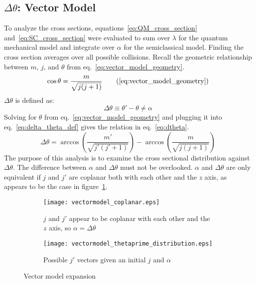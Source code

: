 \documentclass[letterpaper,titlepage,12pt]{article}
\begin{document}
\subsection{$\Delta \theta$: Vector Model}
To analyze the cross sections, equations~\ref{eq:QM_cross_section}
and~\ref{eq:SC_cross_section} were evaluated to sum over $\lambda$ for the quantum
mechanical model and integrate over $\alpha$ for the semiclassical model.
Finding the cross section averages over all possible collisions.  Recall the
geometric relationship between $m$, $j$, and $\theta$ from
eq.~\ref{eq:vector_model_geometry}.
\begin{equation*}
    \cos\theta=\frac{m}{\sqrt{j(j+1)}}
    \tag{\ref{eq:vector_model_geometry}}
\end{equation*}
$\Delta \theta$ is defined as:
\begin{equation}
    \Delta\theta\equiv\theta'-\theta\neq\alpha
    \label{eq:delta_theta_def}
\end{equation}
Solving for $\theta$ from eq.~\ref{eq:vector_model_geometry} and plugging it
into eq.~\ref{eq:delta_theta_def} gives the relation in eq.~\ref{eq:dtheta}.
\begin{equation}
    \Delta\theta = \arccos\left(\frac{m'}{\sqrt{j'(j'+1)}}\right)-\arccos\left(\frac{m}{\sqrt{j(j+1)}}\right)
    \label{eq:dtheta}
\end{equation}
The purpose of this analysis is to examine the cross sectional distribution
against $\Delta\theta$.  The difference between $\alpha$ and $\Delta\theta$
must not be overlooked.  $\alpha$ and $\Delta \theta$ are only equivalent if
$j$ and $j'$ are coplanar both with each other and the $z$ axis, as appears to
be the case in figure~\ref{fig:vectormodel_coplanar}.
\begin{figure}[ht]
    \centering
    \begin{subfigure}{0.49\textwidth}
        \texttt{[image: vectormodel\_coplanar.eps]}
        \caption{$j$ and $j'$ appear to be coplanar with each other and the $z$ axis, so $\alpha=\Delta\theta$}
\label{fig:vectormodel_coplanar}
    \end{subfigure}
    \hspace*{\fill}
    \begin{subfigure}{0.49\textwidth}
        \texttt{[image: vectormodel\_thetaprime\_distribution.eps]}
        \caption{Possible $j'$ vectors given an initial $j$ and $\alpha$}
\label{fig:vectormodel_tpdist}
    \end{subfigure}
    \caption{Vector model expansion}
\label{fig:vectormodelexpansion}
\end{figure}
\end{document}
